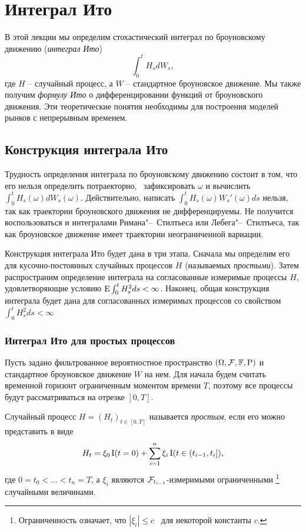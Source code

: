 \chapter{Интеграл Ито}
\label{ch:ito-integral}
\chaptertoc

В этой лекции мы определим стохастический интеграл по броуновскому движению (\emph{интеграл Ито})
\[
\int_0^t H_s d W_s,
\]
где $H$ -- случайный процесс, а $W$ -- стандартное броуновское движение.
Мы также получим \emph{формулу Ито} о дифференцировании функций от броуновского движения.
Эти теоретические понятия необходимы для построения моделей рынков с непрерывным временем.


\section{Конструкция интеграла Ито}

Трудность определения интеграла по броуновскому движению состоит в том, что его нельзя определить потраекторно, \te\ зафиксировать $\omega$ и вычислить $\int_0^t H_s(\omega) d W_s(\omega)$.
Действительно, написать $\int_0^t H_s(\omega) W_s'(\omega) ds$ нельзя, так как траектории броуновского движения не дифференцируемы.
Не получится воспользоваться и интегралами Римана"--~Стилтьеса или Лебега"--~Стилтьеса, так как броуновское движение имеет траектории неограниченной вариации. 

Конструкция интеграла Ито будет дана в три этапа.
Сначала мы определим его для кусочно-постоянных случайных процессов $H$ (называемых \emph{простыми}).
Затем распространим определение интеграла на согласованные измеримые процессы $H$, удовлетворяющие условию $\operatorname{E} \int_0^t H_s^2 ds <\infty$.
Наконец, общая конструкция интеграла будет дана для согласованных измеримых процессов со свойством $\int_0^t H_s^2 ds < \infty$ \as


\subsection{Интеграл Ито для простых процессов}

Пусть задано фильтрованное вероятностное пространство $(\Omega, \mathcal{F}, \mathbb{F}, \mathrm{P})$ и стандартное броуновское движение $W$ на нем.
Для начала будем считать временной горизонт ограниченным моментом времени $T$, поэтому все процессы будут рассматриваться на отрезке $[0,T]$.

\begin{definition}
Случайный процесс $H=(H_t)_{t\in[0,T]}$ называется \emph{простым}, если его можно представить в виде
\begin{equation}
\label{7:simple}
H_t = \xi_0 \operatorname{I}(t=0) + \sum_{i=1}^n \xi_i \operatorname{I}(t \in (t_{i-1}, t_i]),
\end{equation}
где $0= t_0 < \ldots < t_n =  T$, а $\xi_i$ являются $\mathcal{F}_{t_{i-1}}$-измеримыми ограниченными%
\footnote{Ограниченность означает, что $|\xi_i| \le c$ \as\ для некоторой константы $c$.}
случайными величинами.
\end{definition}


